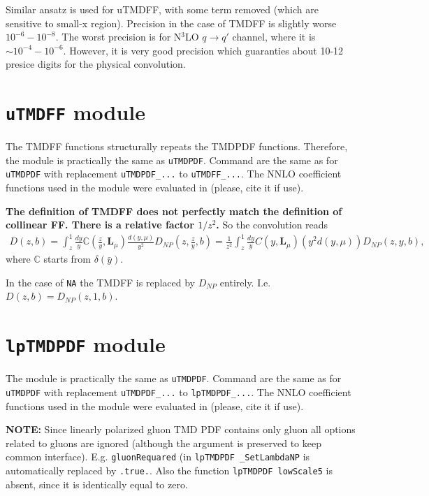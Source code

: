 \documentclass[prd,nofootinbib,eqsecnum,final]{revtex4}
\renewcommand{\(}{\left(}
\renewcommand{\)}{\right)}
\renewcommand{\[}{\left[}
\renewcommand{\]}{\right]}
\begin{document}
Similar ansatz is used for uTMDFF, with some term removed (which are sensitive to small-x region). Precision in the case of TMDFF is slightly worse $10^{-6}-10^{-8}$. The worst precision is for N$^3$LO $q\to q'$ channel, where it is $\sim 10^{-4}-10^{-6}$. However, it is very good precision which guaranties about 10-12 presice digits for the physical convolution.

\newpage

\section{\texttt{uTMDFF} module}
\label{uTMDFF}

The TMDFF functions structurally repeats the TMDPDF functions. Therefore, the module is practically the same as \texttt{uTMDPDF}. Command are the same as for \texttt{uTMDPDF} with replacement \texttt{uTMDPDF\_...} to \texttt{uTMDFF\_...}. The NNLO coefficient functions used in the module were evaluated in \cite{Echevarria:2016scs,Echevarria:2015usa} (please, cite it if use).

\textbf{The definition of TMDFF does not perfectly match the definition of collinear FF. There is a relative factor $1/z^2$.} So the convolution reads
\begin{eqnarray}
D(z,b)=\int_z^1 \frac{dy}{y}\mathbb{C}\(\frac{z}{y},\mathbf{L}_\mu\)\frac{d(y,\mu)}{y^2}D_{NP}(z,\frac{z}{y},b)=
\frac{1}{z^2}\int_z^1 \frac{dy}{y}C\(y,\mathbf{L}_\mu\)(y^2d(y,\mu))D_{NP}(z,y,b),
\end{eqnarray}
where $\mathbb{C}$ starts from $\delta(\bar y)$.

In the case of \texttt{NA} the TMDFF is replaced by $D_{NP}$ entirely. I.e. $D(z,b)=D_{NP}(z,1,b)$.

\section{\texttt{lpTMDPDF} module}
\label{lpTMDPDF}

The module is practically the same as \texttt{uTMDPDF}. Command are the same as for \texttt{uTMDPDF} with replacement \texttt{uTMDPDF\_...} to \texttt{lpTMDPDF\_...}. The NNLO coefficient functions used in the module were evaluated in \cite{Gutierrez-Reyes:2019rug} (please, cite it if use).

\begin{tcolorbox}
\textbf{NOTE:} Since linearly polarized gluon TMD PDF contains only gluon all options related to gluons are ignored (although the argument is preserved to keep common interface). E.g. \texttt{gluonRequared} (in \texttt{lpTMDPDF \_SetLambdaNP} is automatically replaced by \texttt{.true.}. Also the function \texttt{lpTMDPDF lowScale5} is absent, since it is identically equal to zero.
\end{tcolorbox}
\end{document}
